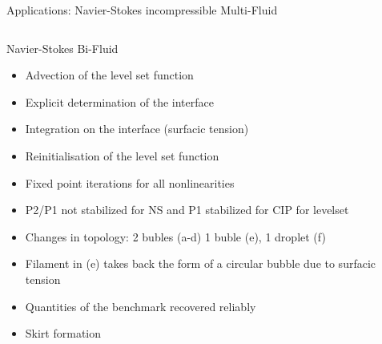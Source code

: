 \documentclass[final,utf8,,hyperref={pdfpagelabels=false}]{beamer}
\begin{document}
\begin{frame}[containsverbatim]{}
\begin{columns}[c]
\begin{block}{Applications: Navier-Stokes incompressible Multi-Fluid}
\begin{columns}[t]
\begin{column}{.48\textwidth}
\begin{block}{Navier-Stokes Bi-Fluid}
\begin{itemize}
            \item Advection of the level set function
            \item Explicit determination of the interface
            \item Integration on the interface (surfacic tension)
            \item Reinitialisation of the  level set function
              
            \item Fixed point iterations for all nonlinearities
            \item P2/P1 not stabilized for NS and P1 stabilized for CIP for levelset
              
            \item Changes in topology: 2 bubles (a-d) 1 buble (e), 1 droplet (f)
            \item Filament in (e) takes back the form of a circular bubble due
              to surfacic tension

            \item Quantities of the benchmark recovered reliably
            \item Skirt formation
            \end{itemize}
          \end{block}
        \end{column}
      \end{columns}

  \end{block}

  \end{columns}
  
  \end{frame}

  
\end{document}
